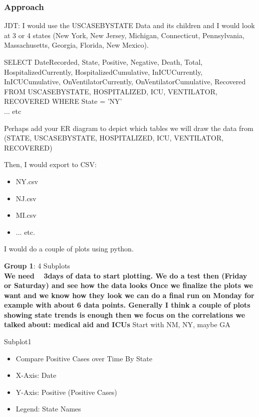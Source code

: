 \documentclass[11pt]{article}
\begin{document}
\subsubsection{Approach}

\noindent
JDT: I would use the USCASEBYSTATE Data and its children and I would look at 3 or 4 states (New York, New Jersey, Michigan, Connecticut, Pennsylvania, Massachusetts, Georgia, Florida, New Mexico).

\noindent
SELECT DateRecorded, State, Positive, Negative, Death, Total, HospitalizedCurrently, HospitalizedCumulative, InICUCurrently, InICUCumulative, OnVentilatorCurrently, OnVentilatorCumulative, Recovered FROM USCASEBYSTATE, HOSPITALIZED, ICU, VENTILATOR, RECOVERED WHERE State = 'NY' \\
\noindent
... etc

\noindent Perhaps add your ER diagram to depict which tables we will draw the data from (STATE, USCASEBYSTATE, HOSPITALIZED, ICU, VENTILATOR, RECOVERED)

\noindent
Then, I would export to CSV:
\begin{itemize}
    \item NY.csv
    \item NJ.csv
    \item MI.csv
    \item ... etc.
\end{itemize}

\noindent
I would do a couple of plots using python.

\pagebreak

\noindent
\textbf{Group 1}: 4 Subplots \\

\textbf{We need ~ 3days of data to start plotting. We do a test then (Friday or Saturday) and see how the data looks Once we finalize the plots we want and we know how they look we can do a final run on Monday for example with about 6 data points. Generally I think a couple of plots showing state trends is enough then we focus on the correlations we talked about: medical aid and ICUs} Start with NM, NY, maybe GA

\noindent
Subplot1
\begin{itemize}
    \item Compare Positive Cases over Time By State
    \item X-Axis: Date
    \item Y-Axis: Positive (Positive Cases)
    \item Legend: State Names
\end{itemize}
\end{document}
